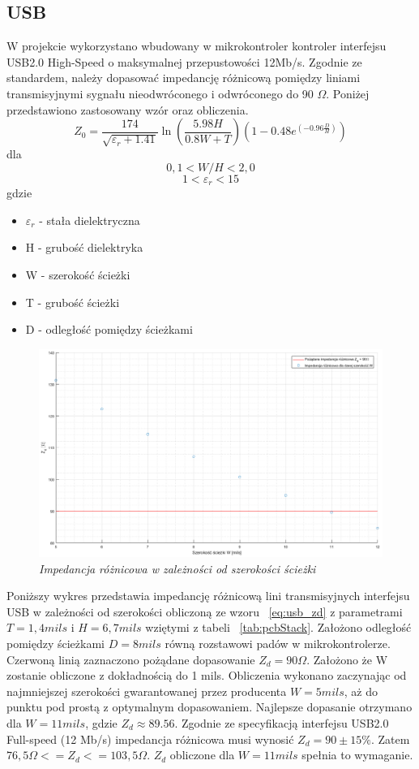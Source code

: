 \documentclass[eng,printmode]{mgr}
\begin{document}
\subsection{USB}
W projekcie wykorzystano wbudowany w mikrokontroler kontroler interfejsu USB2.0 High-Speed o maksymalnej przepustowości 12Mb/s. Zgodnie ze standardem, należy dopasować impedancję różnicową pomiędzy liniami transmisyjnymi sygnału nieodwróconego i odwróconego do 90 \textbf{$\Omega$}. Poniżej przedstawiono zastosowany wzór oraz obliczenia.
\begin{equation}
Z_0= \frac{174}{\sqrt{\varepsilon_r + 1.41}}\ln{\left(\frac{5.98H}{0.8W + T}\right)} \left(1-0.48e^{(-0.96\frac{D}{H})}\right) \label{eq:usb_zd}
\end{equation}
dla 
$$
0,1 < W/H < 2,0
$$
$$
1 < \varepsilon_r < 15
$$
gdzie
\begin{itemize}
  \item \textbf{$\varepsilon_r$} - stała dielektryczna
  \item H - grubość dielektryka
  \item W - szerokość ścieżki
  \item T - grubość ścieżki
  \item D - odległość pomiędzy ścieżkami
\end{itemize}

\begin{figure}[!h]
    \centering
    \includegraphics[width=\textwidth]{plots/usbzD.png}
    \caption{\textit{\scriptsize Impedancja różnicowa w zależności od szerokości ścieżki}}
\end{figure}

Poniższy wykres przedstawia impedancję różnicową lini transmisyjnych interfejsu USB w zależności od szerokości obliczoną ze wzoru ~\ref{eq:usb_zd} z parametrami $T = 1,4 mils$ i $H = 6,7 mils$ wziętymi z tabeli ~\ref{tab:pcbStack}. Założono odległość pomiędzy ścieżkami $ D = 8mils$ równą rozstawowi padów w mikrokontrolerze. Czerwoną linią zaznaczono pożądane dopasowanie $Z_d = 90 \Omega$. Założono że W zostanie obliczone z dokładnością do 1 mils. Obliczenia wykonano zaczynając od najmniejszej szerokości gwarantowanej przez producenta $W = 5 mils$, aż do punktu pod prostą z optymalnym dopasowaniem. Najlepsze dopasanie otrzymano dla $W = 11 mils$, gdzie $Z_d \approx 89.56$. Zgodnie ze specyfikacją interfejsu USB2.0 Full-speed (12 Mb/s) impedancja różnicowa musi wynosić $Z_d = 90 \pm 15\%$. Zatem $ 76,5\Omega <= Z_d <= 103,5\Omega$. $Z_d$ obliczone dla $W = 11mils$ spełnia to wymaganie.
\end{document}
